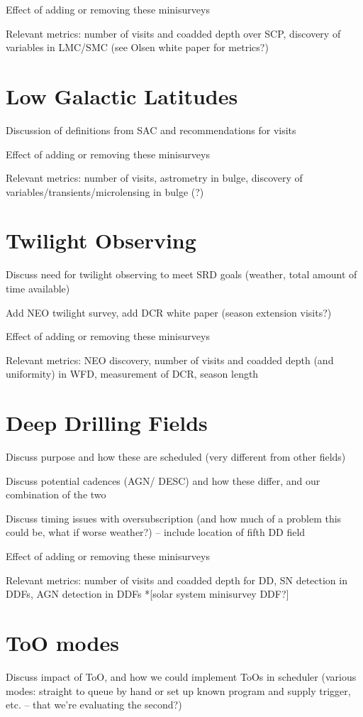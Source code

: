 Effect of adding or removing these minisurveys

Relevant metrics: number of visits and coadded depth over SCP, discovery of variables in LMC/SMC (see Olsen white paper for metrics?)

\section{Low Galactic Latitudes}
Discussion of definitions from SAC and recommendations for visits

Effect of adding or removing these minisurveys

Relevant metrics: number of visits, astrometry in bulge, discovery of variables/transients/microlensing in bulge (?)

\section{Twilight Observing}
Discuss need for twilight observing to meet SRD goals (weather, total amount of time available)

Add NEO twilight survey, add DCR white paper (season extension visits?)

Effect of adding or removing these minisurveys

Relevant metrics: NEO discovery, number of visits and coadded depth (and uniformity) in WFD, measurement of DCR, season length

\section{Deep Drilling Fields}
Discuss purpose and how these are scheduled (very different from other fields)

Discuss potential cadences (AGN/ DESC) and how these differ, and our combination of the two

Discuss timing issues with oversubscription (and how much of a problem this could be, what if worse weather?) -- include location of fifth DD field

Effect of adding or removing these minisurveys

Relevant metrics: number of visits and coadded depth for DD, SN detection in DDFs, AGN detection in DDFs
*[solar system minisurvey DDF?]

\section{ToO modes}
Discuss impact of ToO, and how we could implement ToOs in scheduler (various modes: straight to queue by hand or set up known program and supply trigger, etc. -- that we're evaluating the second?)

